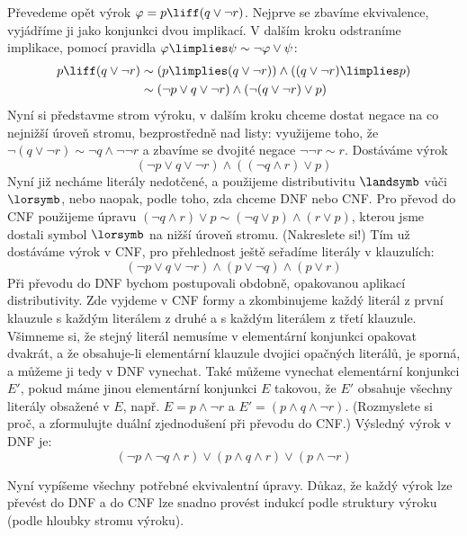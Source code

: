 \begin{example}
    Převedeme opět výrok $\varphi=p\liff (q\lor \neg r)$. Nejprve se zbavíme ekvivalence, vyjádříme ji jako konjunkci dvou implikací. V dalším kroku odstraníme implikace, pomocí pravidla $\varphi\limplies\psi\sim\neg\varphi\lor\psi$:
    \begin{align*}
        p\liff (q\lor \neg r) &\sim (p\limplies (q\lor \neg r)) \land ((q\lor \neg r) \limplies p)\\
        &\sim (\neg p\lor q\lor \neg r) \land (\neg (q\lor \neg r) \lor p)
    \end{align*}
    Nyní si představme strom výroku, v dalším kroku chceme dostat negace na co nejnižší úroveň stromu, bezprostředně nad listy: využijeme toho, že $\neg (q\lor \neg r)\sim \neg q\land \neg\neg r$ a zbavíme se dvojité negace $\neg\neg r\sim r$. Dostáváme výrok 
    $$
    (\neg p\lor q\lor \neg r) \land ( (\neg q\land r) \lor p)
    $$
    Nyní již necháme literály nedotčené, a použijeme distributivitu $\landsymb$ vůči $\lorsymb$, nebo naopak, podle toho, zda chceme DNF nebo CNF. Pro převod do CNF použijeme úpravu $(\neg q\land r) \lor p\sim (\neg q\lor p)\land (r \lor p) $, kterou jsme dostali symbol $\lorsymb$ na nižší úroveň stromu. (Nakreslete si!) Tím už dostáváme výrok v CNF, pro přehlednost ještě seřadíme literály v klauzulích:
    $$
    (\neg p\lor q\lor \neg r) \land (p\lor \neg q) \land (p \lor r) 
    $$
    Při převodu do DNF bychom postupovali obdobně, opakovanou aplikací distributivity. Zde vyjdeme v CNF formy a zkombinujeme každý literál z první klauzule s každým literálem z druhé a s každým literálem z třetí klauzule. Všimneme si, že stejný literál nemusíme v elementární konjunkci opakovat dvakrát, a že obsahuje-li elementární klauzule dvojici opačných literálů, je sporná, a můžeme ji tedy v DNF vynechat. Také můžeme vynechat elementární konjunkci $E'$, pokud máme jinou elementární konjunkci $E$ takovou, že $E'$ obsahuje všechny literály obsažené v $E$, např. $E=p\land \neg r$ a $E'=(p\land q \land \neg r)$. (Rozmyslete si proč, a zformulujte duální zjednodušení při převodu do CNF.) Výsledný výrok v DNF je:
    $$
    (\neg p \land \neg q\land r) \lor (p\land q \land r) \lor (p\land \neg r)
    $$
\end{example}

Nyní vypíšeme všechny potřebné ekvivalentní úpravy. Důkaz, že každý výrok lze převést do DNF a do CNF lze snadno provést indukcí podle struktury výroku (podle hloubky stromu výroku).

